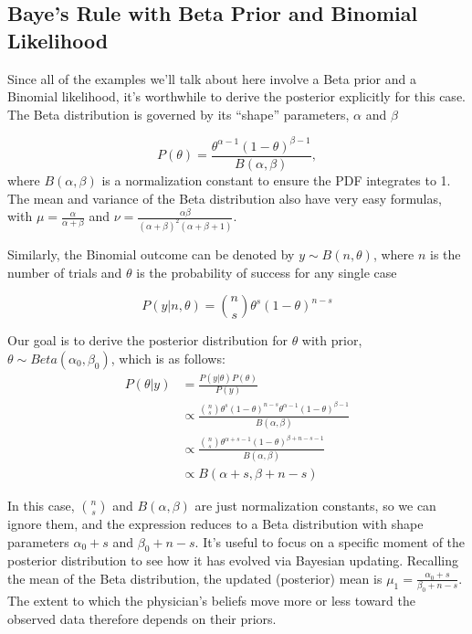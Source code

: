 \documentclass[
  letterpaper,
  DIV=11,
  numbers=noendperiod]{scrreport}
\theoremstyle{definition}
\theoremstyle{remark}
\begin{document}
\hypertarget{bayes-rule-with-beta-prior-and-binomial-likelihood}{%
\subsection{Baye's Rule with Beta Prior and Binomial
Likelihood}\label{bayes-rule-with-beta-prior-and-binomial-likelihood}}

Since all of the examples we'll talk about here involve a Beta prior and
a Binomial likelihood, it's worthwhile to derive the posterior
explicitly for this case. The Beta distribution is governed by its
``shape'' parameters, \(\alpha\) and \(\beta\)

\[P(θ) = \frac{\theta^{\alpha-1} (1 - \theta)^{\beta-1} }{B(\alpha, \beta)},\]
where \(B(\alpha, \beta)\) is a normalization constant to ensure the PDF
integrates to 1. The mean and variance of the Beta distribution also
have very easy formulas, with \(\mu = \frac{\alpha}{\alpha + \beta}\)
and
\(\nu = \frac{\alpha \beta}{(\alpha + \beta)^{2} (\alpha+ \beta + 1)}\).

Similarly, the Binomial outcome can be denoted by \(y\sim B(n,\theta)\),
where \(n\) is the number of trials and \(\theta\) is the probability of
success for any single case

\[ P(y|n, \theta) = {n \choose s} \theta^{s} (1-\theta)^{n-s}\]

Our goal is to derive the posterior distribution for \(\theta\) with
prior, \(\theta \sim Beta(\alpha_{0}, \beta_{0})\), which is as follows:
\[\begin{align}
P(\theta | y) &= \frac{P(y| \theta) P(\theta)}{P(y)} \\
 & \propto \frac{ {n \choose s} \theta^{s} (1 - \theta)^{n - s} \theta^{\alpha-1} (1 - \theta)^{\beta-1} } { B(\alpha, \beta) } \\
 & \propto \frac{ {n \choose s} \theta^{\alpha+s-1} (1 - \theta)^{\beta+n-s-1} } { B(\alpha, \beta) } \\
 & \propto B(\alpha+s, \beta + n - s)
\end{align}\]

In this case, \({n \choose s}\) and \(B(\alpha, \beta)\) are just
normalization constants, so we can ignore them, and the expression
reduces to a Beta distribution with shape parameters \(\alpha_{0}+s\)
and \(\beta_{0} + n - s\). It's useful to focus on a specific moment of
the posterior distribution to see how it has evolved via Bayesian
updating. Recalling the mean of the Beta distribution, the updated
(posterior) mean is
\(\mu_{1} = \frac{\alpha_{0}+s}{\beta_{0} + n - s}\). The extent to
which the physician's beliefs move more or less toward the observed data
therefore depends on their priors.
\end{document}
